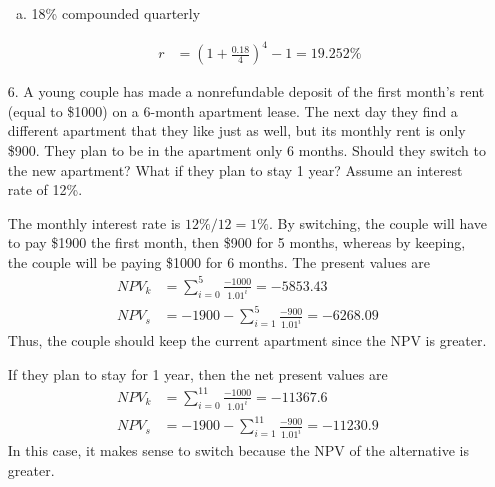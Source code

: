 \documentclass{article}
\begin{document}
\begin{itemize}
\begin{enumerate}[(a)]
			\item 18\% compounded quarterly 
				\begin{answer*}
					\begin{align*}
						r &= \left( 1+\frac{0.18}{4} \right)^4 - 1 = 19.252\%
					\end{align*}
				\end{answer*}

		\end{enumerate}

	\item[6.] A young couple has made a nonrefundable deposit of the first month's rent (equal to \$1000) on a 6-month apartment lease. The next day they find a different apartment that they like just as well, but its monthly rent is only \$900. They plan to be in the apartment only 6 months. Should they switch to the new apartment? What if they plan to stay 1 year? Assume an interest rate of 12\%.
		\begin{soln}
			The monthly interest rate is $12\%/12 = 1\%.$ By switching, the couple will have to pay \$1900 the first month, then \$900 for 5 months, whereas by keeping, the couple will be paying \$1000 for 6 months. The present values are
			\begin{align*}
				NPV_k &= \sum_{i=0}^{5} \frac{-1000}{1.01^i} = -5853.43 \\
				NPV_s &= -1900 - \sum_{i=1}^{5} \frac{-900}{1.01^i} = -6268.09
			\end{align*}
			Thus, the couple should keep the current apartment since the NPV is greater.

			If they plan to stay for 1 year, then the net present values are
			\begin{align*}
				NPV_k &= \sum_{i=0}^{11} \frac{-1000}{1.01^i} = -11367.6 \\
				NPV_s &= -1900 - \sum_{i=1}^{11} \frac{-900}{1.01^i} = -11230.9
			\end{align*}
			In this case, it makes sense to switch because the NPV of the alternative is greater.
		\end{soln}


\end{itemize}
\end{document}
